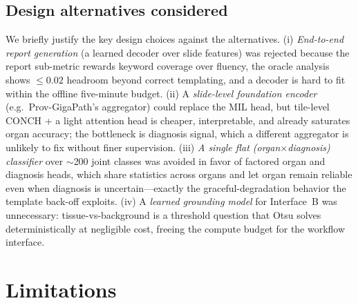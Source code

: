 \documentclass[11pt,a4paper]{article}
\begin{document}
\subsection{Design alternatives considered}
We briefly justify the key design choices against the alternatives. (i) \emph{End-to-end report
generation} (a learned decoder over slide features) was rejected because the report sub-metric
rewards keyword coverage over fluency, the oracle analysis shows $\le 0.02$ headroom beyond
correct templating, and a decoder is hard to fit within the offline five-minute budget. (ii) A
\emph{slide-level foundation encoder} (e.g.\ Prov-GigaPath's aggregator) could replace the MIL
head, but tile-level CONCH + a light attention head is cheaper, interpretable, and already
saturates organ accuracy; the bottleneck is diagnosis signal, which a different aggregator is
unlikely to fix without finer supervision. (iii) \emph{A single flat (organ$\times$diagnosis)
classifier} over $\sim$200 joint classes was avoided in favor of factored organ and diagnosis
heads, which share statistics across organs and let organ remain reliable even when diagnosis is
uncertain---exactly the graceful-degradation behavior the template back-off exploits. (iv) A
\emph{learned grounding model} for Interface~B was unnecessary: tissue-vs-background is a
threshold question that Otsu solves deterministically at negligible cost, freeing the compute
budget for the workflow interface.

\section{Limitations}
\label{sec:limitations}
\end{document}
